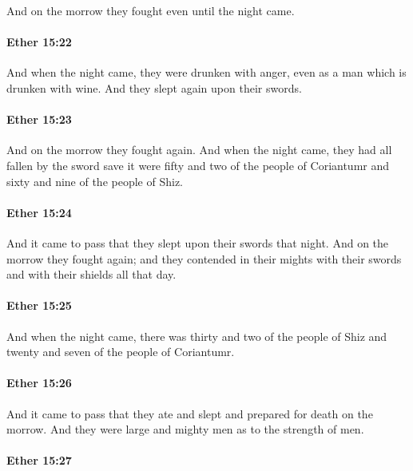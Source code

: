 			And on the morrow they fought even until the night came.

		\paragraph{Ether 15:22} %
			\label{ETHER-15-22}

			And when the night came,
			they were drunken with anger,
			even as a man which is drunken with wine.
			And they slept again upon their swords.

		\paragraph{Ether 15:23} %
			\label{ETHER-15-23}

			And on the morrow they fought again.
			And when the night came, they had all fallen by the sword
			save it were fifty and two of the people of Coriantumr
			and sixty and nine of the people of Shiz.

		\paragraph{Ether 15:24} %
			\label{ETHER-15-24}

			And it came to pass that they slept upon their swords that night.
			And on the morrow they fought again;
			and they contended in their mights
			with their swords and with their shields all that day.

		\paragraph{Ether 15:25} %
			\label{ETHER-15-25}

			And when the night came, there was thirty and two of the people of Shiz
			and twenty and seven of the people of Coriantumr.

		\paragraph{Ether 15:26} %
			\label{ETHER-15-26}

			And it came to pass that they ate and slept
			and prepared for death on the morrow.
			And they were large and mighty men as to the strength of men.

		\paragraph{Ether 15:27} %
			\label{ETHER-15-27}


